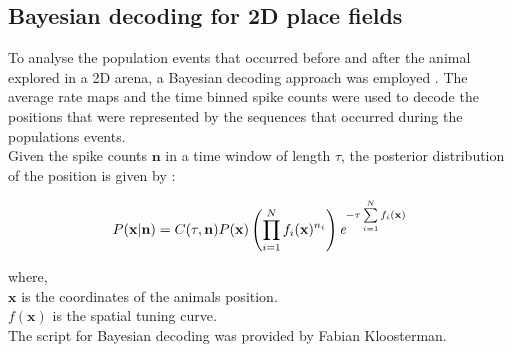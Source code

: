 \subsection{Bayesian decoding for 2D place fields}
To analyse the population events that occurred before and after the animal explored in a 2D arena, a Bayesian decoding approach was employed \cite{Zhang2013}. The average rate maps and the time binned spike counts were used to decode the positions that were represented by the sequences that occurred during the populations events. \\
Given the spike counts $\mathbf{n}$ in a time window of length $\tau$, the posterior distribution of the position is given by : 

\[ 
P( \mathbf{x} | \mathbf{n}) = C(\tau, \mathbf{n}) P(\mathbf{x}) \left(\prod_{i = 1}^{N} f_{i}(\mathbf{x})^{n_i} \right) \emph{e}^{-\tau \sum\limits_{i = 1}^{N} f_{i}(\mathbf{x}) }
 \]

where, \\
$\mathbf{x}$ is the coordinates of the animals position.\\
$f(\mathbf{x})$ is the spatial tuning curve.\\
The script for Bayesian decoding was provided by Fabian Kloosterman.
	
